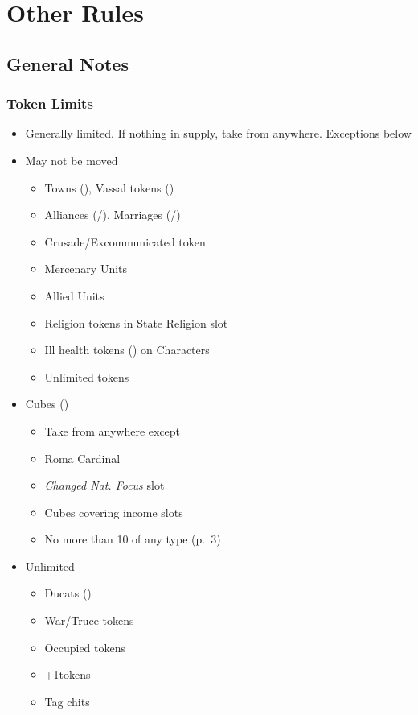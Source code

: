 \documentclass[10pt]{article}
\begin{document}
\addfooter

\section*{Other Rules}

\subsection*{General Notes }
\subsubsection*{Token Limits}
\begin{itemize}
	\item Generally limited. If nothing in supply, take from anywhere. Exceptions below
	\item May not be moved
	\begin{itemize}
		\item Towns (\town), Vassal tokens (\vassal)
		\item Alliances (\alliance/\activeally), Marriages (\marriage/\disputedsuccession)
		\item Crusade/Excommunicated token
		\item Mercenary Units
		\item Allied Units
		\item Religion tokens in State Religion slot
		\item Ill health tokens (\illhealth) on Characters
		\item \dprime Unlimited\dprime\xspace tokens
	\end{itemize}
	\item Cubes (\cube)
	\begin{itemize}
		\item Take from anywhere except
		\item Roma Cardinal
		\item \emph{Changed Nat. Focus} slot
		\item Cubes covering income slots
		\item No more than 10 \monarchpower of any type (p.~3)
	\end{itemize}
	\item Unlimited
	\begin{itemize}
		\item Ducats (\ducats)
		\item War/Truce tokens
		\item Occupied tokens
		\item +1\manpower tokens
		\item Tag chits
	\end{itemize}
\end{itemize}
\end{document}
